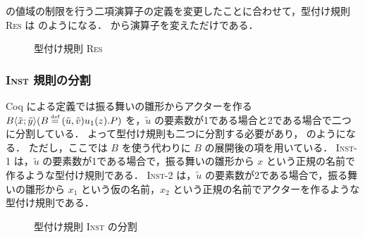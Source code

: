 \tmp の値域の制限を行う二項演算子の定義を変更したことに合わせて，型付け規則 \textsc{Res} は  のようになる． から演算子を変えただけである．

\begin{figure}[t]
  \caption{型付け規則 \textsc{Res}}
  \label{api:res_rule}
\end{figure}

\subsubsection{\textsc{Inst} 規則の分割}

Coq による定義では振る舞いの雛形からアクターを作る\conf $\behaviorconf{\tilde{x}}{\tilde{y}} (B \defeq \behaviortemplate{\tilde{u}}{\tilde{v}}{u_1}{z}{P})$ を，$\tilde{u}$ の要素数が1である場合と2である場合で二つに分割している．
よって型付け規則も二つに分割する必要があり， のようになる．
ただし，ここでは $B$ を使う代わりに $B$ の展開後の項を用いている．
\textsc{Inst-1} は，$\tilde{u}$ の要素数が1である場合で，振る舞いの雛形から $x$ という正規の名前で作るような型付け規則である．
\textsc{Inst-2} は，$\tilde{u}$ の要素数が2である場合で，振る舞いの雛形から $x_1$ という仮の名前，$x_2$ という正規の名前でアクターを作るような型付け規則である．


\begin{figure}[t]
  \vspace{14pt}
  \caption{型付け規則 \textsc{Inst} の分割}
  \label{api:inst_rule}
\end{figure}





